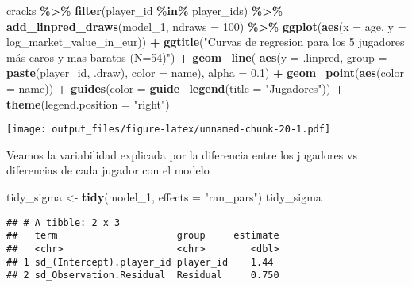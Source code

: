 \documentclass[
]{article}
\newenvironment{Shaded}{\begin{snugshade}}{\end{snugshade}}
\newcommand{\AttributeTok}[1]{\textcolor[rgb]{0.13,0.29,0.53}{#1}}
\newcommand{\DecValTok}[1]{\textcolor[rgb]{0.00,0.00,0.81}{#1}}
\newcommand{\FloatTok}[1]{\textcolor[rgb]{0.00,0.00,0.81}{#1}}
\newcommand{\FunctionTok}[1]{\textcolor[rgb]{0.13,0.29,0.53}{\textbf{#1}}}
\newcommand{\NormalTok}[1]{#1}
\newcommand{\OtherTok}[1]{\textcolor[rgb]{0.56,0.35,0.01}{#1}}
\newcommand{\SpecialCharTok}[1]{\textcolor[rgb]{0.81,0.36,0.00}{\textbf{#1}}}
\newcommand{\StringTok}[1]{\textcolor[rgb]{0.31,0.60,0.02}{#1}}
\begin{document}
\begin{Shaded}
\begin{Highlighting}[]
\NormalTok{cracks }\SpecialCharTok{\%\textgreater{}\%}
  \FunctionTok{filter}\NormalTok{(player\_id }\SpecialCharTok{\%in\%}\NormalTok{ player\_ids) }\SpecialCharTok{\%\textgreater{}\%}
  \FunctionTok{add\_linpred\_draws}\NormalTok{(model\_1, }\AttributeTok{ndraws =} \DecValTok{100}\NormalTok{) }\SpecialCharTok{\%\textgreater{}\%}
  \FunctionTok{ggplot}\NormalTok{(}\FunctionTok{aes}\NormalTok{(}\AttributeTok{x =}\NormalTok{ age, }\AttributeTok{y =}\NormalTok{ log\_market\_value\_in\_eur)) }\SpecialCharTok{+}
  \FunctionTok{ggtitle}\NormalTok{(}\StringTok{"Curvas de regresion para los 5 jugadores más caros y mas baratos (N=54)"}\NormalTok{) }\SpecialCharTok{+}
  \FunctionTok{geom\_line}\NormalTok{( }\FunctionTok{aes}\NormalTok{(}\AttributeTok{y =}\NormalTok{ .linpred, }\AttributeTok{group =} \FunctionTok{paste}\NormalTok{(player\_id, .draw), }\AttributeTok{color =}\NormalTok{ name), }\AttributeTok{alpha =} \FloatTok{0.1}\NormalTok{) }\SpecialCharTok{+} 
  \FunctionTok{geom\_point}\NormalTok{(}\FunctionTok{aes}\NormalTok{(}\AttributeTok{color =}\NormalTok{ name)) }\SpecialCharTok{+} 
  \FunctionTok{guides}\NormalTok{(}\AttributeTok{color =} \FunctionTok{guide\_legend}\NormalTok{(}\AttributeTok{title =} \StringTok{"Jugadores"}\NormalTok{)) }\SpecialCharTok{+}
  \FunctionTok{theme}\NormalTok{(}\AttributeTok{legend.position =} \StringTok{"right"}\NormalTok{)}
\end{Highlighting}
\end{Shaded}

\texttt{[image: output\_files/figure-latex/unnamed-chunk-20-1.pdf]}

Veamos la variabilidad explicada por la diferencia entre los jugadores
vs diferencias de cada jugador con el modelo

\begin{Shaded}
\begin{Highlighting}[]
\NormalTok{tidy\_sigma }\OtherTok{\textless{}{-}} \FunctionTok{tidy}\NormalTok{(model\_1, }\AttributeTok{effects =} \StringTok{"ran\_pars"}\NormalTok{)}
\NormalTok{tidy\_sigma}
\end{Highlighting}
\end{Shaded}

\begin{verbatim}
## # A tibble: 2 x 3
##   term                     group     estimate
##   <chr>                    <chr>        <dbl>
## 1 sd_(Intercept).player_id player_id    1.44 
## 2 sd_Observation.Residual  Residual     0.750
\end{verbatim}
\end{document}
